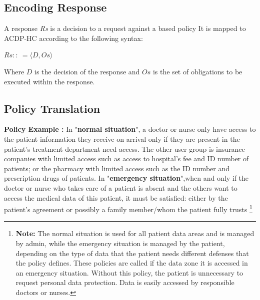 \documentclass[conference]{IEEEtran}
\begin{document}
\subsection{Encoding Response}\label{Back:response}

A response \textit{Rs} is a decision to a request against a based policy 
It is mapped to ACDP-HC according to the following syntax:

$Rs ::\: = \langle D, Os \rangle$

Where $D$ is the decision of the response and $Os$ is the set of obligations to be executed within the response. 

\subsection{Policy Translation}\label{Back:policy}

\textbf{Policy Example :} In "\textbf{normal situation}", a doctor or nurse only have access to the patient information they receive on arrival only if they are present in the patient's treatment department need access. 
The other user group is insurance companies with limited access such as access to hospital's fee and ID number of patients; or the pharmacy with limited access such as the ID number and prescription drugs of patients.
In "\textbf{emergency situation}",when and only if the doctor or nurse who takes care of a patient is absent and the others want to access the medical data of this patient, it must be satisfied: either by the patient's agreement or possibly a family member/whom the patient fully trusts%
\footnote{\textbf{Note: }The normal situation is used for all patient data areas and is managed by admin, while the emergency situation is managed by the patient, depending on the type of data that the patient needs different defenses that the policy defines. 
These policies are called if the data zone it is accessed in an emergency situation.
Without this policy, the patient is unnecessary to request personal data protection.
Data is easily accessed by responsible doctors or nurses.} 
\end{document}
